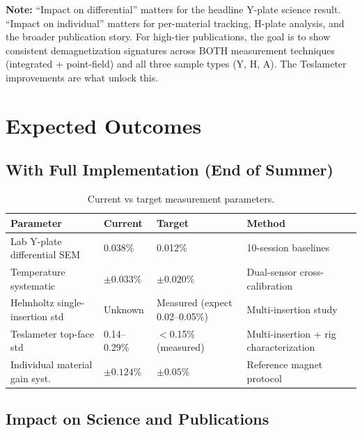 \documentclass[11pt,letterpaper]{article}
\begin{document}
\textbf{Note:} ``Impact on differential'' matters for the headline Y-plate
science result. ``Impact on individual'' matters for per-material tracking,
H-plate analysis, and the broader publication story. For high-tier publications,
the goal is to show consistent demagnetization signatures across BOTH measurement
techniques (integrated + point-field) and all three sample types (Y, H, A). The
Teslameter improvements are what unlock this.


\section{Expected Outcomes}
\label{sec:outcomes}

\subsection{With Full Implementation (End of Summer)}

\begin{table}[htbp]
\centering
\caption{Current vs target measurement parameters.}
\label{tab:outcomes}
\begin{tabular}{@{}lp{2.5cm}p{2.5cm}p{4.5cm}@{}}
\toprule
Parameter & Current & Target & Method \\
\midrule
Lab Y-plate differential SEM          & 0.038\%            & 0.012\%                       & 10-session baselines \\
Temperature systematic                 & $\pm 0.033\%$     & $\pm 0.020\%$                 & Dual-sensor cross-calibration \\
Helmholtz single-insertion std         & Unknown            & Measured (expect 0.02--0.05\%) & Multi-insertion study \\
Teslameter top-face std                & 0.14--0.29\%      & $<$0.15\% (measured)           & Multi-insertion + rig characterization \\
Individual material gain syst.         & $\pm 0.124\%$     & $\pm 0.05\%$                  & Reference magnet protocol \\
\bottomrule
\end{tabular}
\end{table}

\subsection{Impact on Science and Publications}
\end{document}
